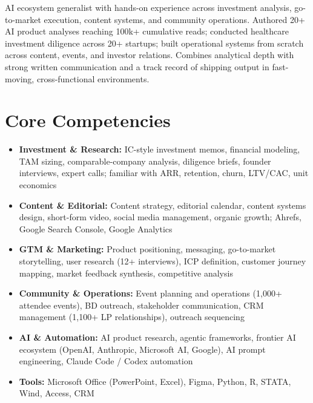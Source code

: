 \documentclass[11pt,a4paper,sans]{moderncv}
\begin{document}
\makecvtitle


\vspace{6pt}
\small{AI ecosystem generalist with hands-on experience across investment analysis, go-to-market execution, content systems, and community operations. Authored 20+ AI product analyses reaching 100k+ cumulative reads; conducted healthcare investment diligence across 20+ startups; built operational systems from scratch across content, events, and investor relations. Combines analytical depth with strong written communication and a track record of shipping output in fast-moving, cross-functional environments.}


\section{Core Competencies}
\vspace{1pt}
\begin{itemize}

\item \textbf{Investment \& Research:} IC-style investment memos, financial modeling, TAM sizing, comparable-company analysis, diligence briefs, founder interviews, expert calls; familiar with ARR, retention, churn, LTV/CAC, unit economics

\item \textbf{Content \& Editorial:} Content strategy, editorial calendar, content systems design, short-form video, social media management, organic growth; Ahrefs, Google Search Console, Google Analytics

\item \textbf{GTM \& Marketing:} Product positioning, messaging, go-to-market storytelling, user research (12+ interviews), ICP definition, customer journey mapping, market feedback synthesis, competitive analysis

\item \textbf{Community \& Operations:} Event planning and operations (1,000+ attendee events), BD outreach, stakeholder communication, CRM management (1,100+ LP relationships), outreach sequencing

\item \textbf{AI \& Automation:} AI product research, agentic frameworks, frontier AI ecosystem (OpenAI, Anthropic, Microsoft AI, Google), AI prompt engineering, Claude Code / Codex automation

\item \textbf{Tools:} Microsoft Office (PowerPoint, Excel), Figma, Python, R, STATA, Wind, Access, CRM

\end{itemize}
\end{document}
